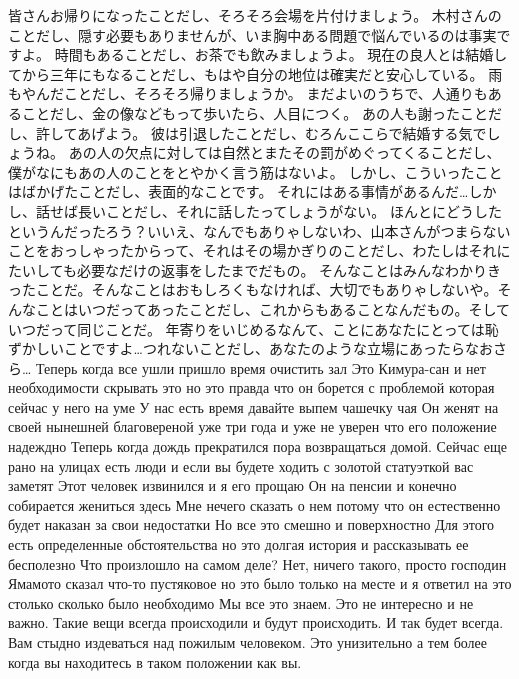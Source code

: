 皆さんお帰りになったことだし、そろそろ会場を片付けましょう。
木村さんのことだし、隠す必要もありませんが、いま胸中ある問題で悩んでいるのは事実ですよ。
時間もあることだし、お茶でも飲みましょうよ。
現在の良人とは結婚してから三年にもなることだし、もはや自分の地位は確実だと安心している。
雨もやんだことだし、そろそろ帰りましょうか。
まだよいのうちで、人通りもあることだし、金の像などもって歩いたら、人目につく。
あの人も謝ったことだし、許してあげよう。
彼は引退したことだし、むろんここらで結婚する気でしょうね。
あの人の欠点に対しては自然とまたその罰がめぐってくることだし、僕がなにもあの人のことをとやかく言う筋はないよ。
しかし、こういったことはばかげたことだし、表面的なことです。
それにはある事情があるんだ…しかし、話せば長いことだし、それに話したってしょうがない。
ほんとにどうしたというんだったろう？いいえ、なんでもありゃしないわ、山本さんがつまらないことをおっしゃったからって、それはその場かぎりのことだし、わたしはそれにたいしても必要なだけの返事をしたまでだもの。
そんなことはみんなわかりきったことだ。そんなことはおもしろくもなければ、大切でもありゃしないや。そんなことはいつだってあったことだし、これからもあることなんだもの。そしていつだって同じことだ。
年寄りをいじめるなんて、ことにあなたにとっては恥ずかしいことですよ…つれないことだし、あなたのような立場にあったらなおさら…
Теперь когда все ушли пришло время очистить зал
Это Кимура-сан и нет необходимости скрывать это но это правда что он борется с проблемой которая сейчас у него на уме 
У нас есть время давайте выпем чашечку чая
Он женят на своей нынешней благовереной уже три года и уже не уверен что его положение надеждно
Теперь когда дождь прекратился пора возвращаться домой.
Сейчас еще рано на улицах есть люди и если вы будете ходить с золотой статуэткой вас заметят 
Этот человек извинился и я его прощаю
Он на пенсии и  конечно собирается жениться здесь
Мне нечего сказать о нем потому что он естественно будет наказан за свои недостатки
Но все это смешно и поверхностно
Для этого есть определенные обстоятельства но это долгая история и рассказывать ее бесполезно
Что произлошло на самом деле? Нет, ничего такого, просто господин Ямамото сказал что-то пустяковое но это было только на месте и я ответил на это столько сколько было необходимо
Мы все это знаем. Это не интересно и не важно.
Такие вещи всегда происходили и будут происходить. И так будет всегда.
Вам стыдно издеваться над пожилым человеком. Это унизительно а тем более когда вы находитесь в таком положении как вы.